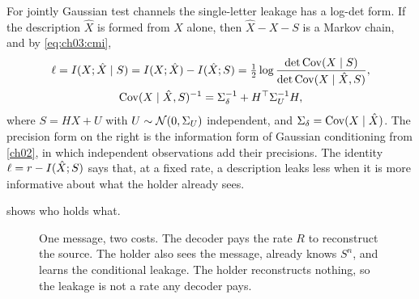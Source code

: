 For jointly Gaussian test channels the single-letter leakage has a log-det form. If the description $\hat X$ is formed from $X$ alone, then $\hat X-X-S$ is a Markov chain, and by \eqref{eq:ch03:cmi},
\begin{equation}\label{eq:ch03:leak-gauss}
\begin{gathered}
\ell=I(X;\hat X\mid S)=I(X;\hat X)-I(\hat X;S)
=\tfrac12\log\frac{\det\operatorname{Cov}(X\mid S)}{\det\operatorname{Cov}(X\mid\hat X,S)},\\
\operatorname{Cov}(X\mid \hat X,S)^{-1}=\Sigma_\delta^{-1}+H^{\top}\Sigma_U^{-1}H,
\end{gathered}
\end{equation}
where $S=HX+U$ with $U\sim\mathcal{N}(0,\Sigma_U)$ independent, and $\Sigma_\delta=\operatorname{Cov}(X\mid\hat X)$. The precision form on the right is the information form of Gaussian conditioning from \cref{ch02}, in which independent observations add their precisions. The identity $\ell=r-I(\hat X;S)$ says that, at a fixed rate, a description leaks less when it is more informative about what the holder already sees.


 shows who holds what.

\begin{figure}[tbp]
\centering
{}
\caption{One message, two costs. The decoder pays the rate $R$ to reconstruct the source. The holder also sees the message, already knows $S^n$, and learns the conditional leakage. The holder reconstructs nothing, so the leakage is not a rate any decoder pays.}
\label{fig:ch03:leak}
\end{figure}

